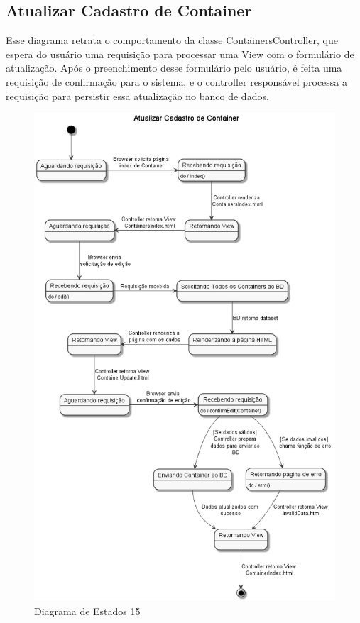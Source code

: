 \documentclass[rascunho,xindy,acronym,symbols]{fei}
\begin{document}
\subsection{Atualizar Cadastro de Container}

Esse diagrama retrata o comportamento da classe ContainersController, que espera do usuário uma requisição para processar uma View com o formulário de atualização. Após o preenchimento desse formulário pelo usuário, é feita uma requisição de confirmação para o sistema, e o controller responsável processa a requisição para persistir essa atualização no banco de dados.

\begin{figure}[H]
    \centering
    \includegraphics[scale=0.6, width=350pt]{./Images/DE_-_Atualizar_Cadastro_de_Container.png}
    \caption{Diagrama de Estados 15}
    \label{fig:diag_est15}
\end{figure}
\end{document}
